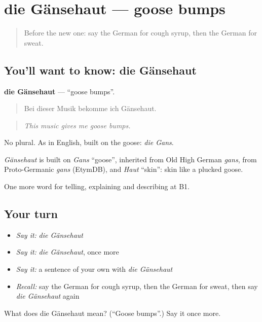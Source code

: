 \section[die Gänsehaut]{die Gänsehaut — goose bumps}

\label{lesson:GE-C479-gaensehaut}



\begin{quote}
Before the new one: say the German for cough syrup, then the German for sweat.
\end{quote}

\subsection*{You'll want to know: die Gänsehaut}
\textbf{die Gänsehaut} — \textquotedblleft{}goose bumps\textquotedblright{}.

\begin{quote}
Bei dieser Musik bekomme ich Gänsehaut.
\end{quote}

\begin{quote}
\emph{This music gives me goose bumps.}
\end{quote}

No plural. As in English, built on the goose: \emph{die Gans}.

\begin{cousinweb}
\emph{Gänsehaut} is built on \emph{Gans} \textquotedblleft{}goose\textquotedblright{}, inherited from Old High German \emph{gans}, from Proto-Germanic \emph{gans} (EtymDB), and \emph{Haut} \textquotedblleft{}skin\textquotedblright{}: skin like a plucked goose.
\end{cousinweb}

\begin{grammarlens}[title={What you've built}]
One more word for telling, explaining and describing at B1.
\end{grammarlens}

\subsection*{Your turn}
\begin{itemize}
\raggedright
  \item \emph{Say it:} \emph{die Gänsehaut}
  \item \emph{Say it:} \emph{die Gänsehaut}, once more
  \item \emph{Say it:} a sentence of your own with \emph{die Gänsehaut}
  \item \emph{Recall:} say the German for cough syrup, then the German for sweat, then say \emph{die Gänsehaut} again
\end{itemize}

\begin{tcolorbox}[breakable,colback=teal!4,colframe=teal!35!black,title={Before you move on}]
What does die Gänsehaut mean? (\textquotedblleft{}Goose bumps\textquotedblright{}.) Say it once more.
\end{tcolorbox}
